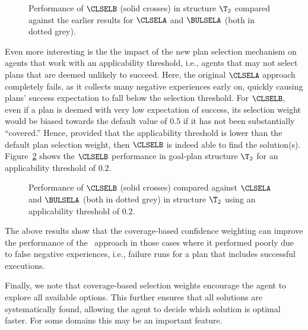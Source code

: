 \begin{figure}[t]
\begin{center}

\caption{Performance of $\CLSELB$ (solid crosses) in structure $\T_2$ compared against
the earlier results for $\CLSELA$ and $\BULSELA$ (both in dotted grey).}
\label{fig:T2_result2}
\end{center}
\end{figure}



Even more interesting is the the impact of the new plan selection mechanism on
agents that work with an applicability threshold, i.e., agents that may not
select plans that are deemed unlikely to succeed.
Here, the original $\CLSELA$ approach completely fails, as it collects many
negative experiences early on, quickly causing plans' success expectation to fall
below the selection threshold. For $\CLSELB$, even if a plan is deemed with very
low expectation of success, its selection weight would be biased towards the
default value of $0.5$ if it has not been substantially ``covered.''
Hence, provided that the applicability threshold is lower than the default plan
selection weight, then $\CLSELB$ is indeed able to find the solution(s).
Figure~\ref{fig:performance-applicability} shows the $\CLSELB$ performance in
goal-plan structure $\T_2$ for an applicability threshold of $0.2$.


\begin{figure}[t]
   \centering
   
   \caption{Performance of $\CLSELB$ (solid crosses) compared against $\CLSELA$ and $\BULSELA$ (both in dotted grey) in structure $\T_2$ using an applicability threshold of $0.2$.}
   \label{fig:performance-applicability}
\end{figure}


The above results show that the coverage-based confidence weighting can improve
the performance of the \CL\ approach in those cases where it performed poorly due
to false negative experiences, i.e., failure runs for a plan that includes
successful executions.


Finally, we note that coverage-based selection weights encourage the agent to
explore all available options. This further ensures that all solutions are
systematically found, allowing the agent to decide which solution is optimal
faster. For some domains this may be an important feature.








